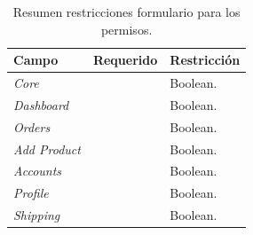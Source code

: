 \begin{table}[H]
    \centering
	\begin{tabular}{ |l|c||l| }
		\hline Campo & Requerido & Restricción \\ \hline
		\multirow{1}{*}{\textit{Core}} 			&  \checkmark 	& Boolean. \\ \hline
		\multirow{1}{*}{\textit{Dashboard}} 	&  \checkmark	& Boolean. \\ \hline
		\multirow{1}{*}{\textit{Orders}} 		&  \checkmark	& Boolean. \\ \hline
		\multirow{1}{*}{\textit{Add Product}} 	&  \checkmark	& Boolean. \\ \hline
		\multirow{1}{*}{\textit{Accounts}} 		&  \checkmark	& Boolean. \\ \hline
		\multirow{1}{*}{\textit{Profile}} 		&  \checkmark	& Boolean. \\ \hline
		\multirow{1}{*}{\textit{Shipping}} 		&  \checkmark	& Boolean. \\ \hline
	\end{tabular}
 	\caption{Resumen restricciones formulario para los permisos.}
    \label{tab:dashboard:account:form:restrictions:account}
\end{table}
